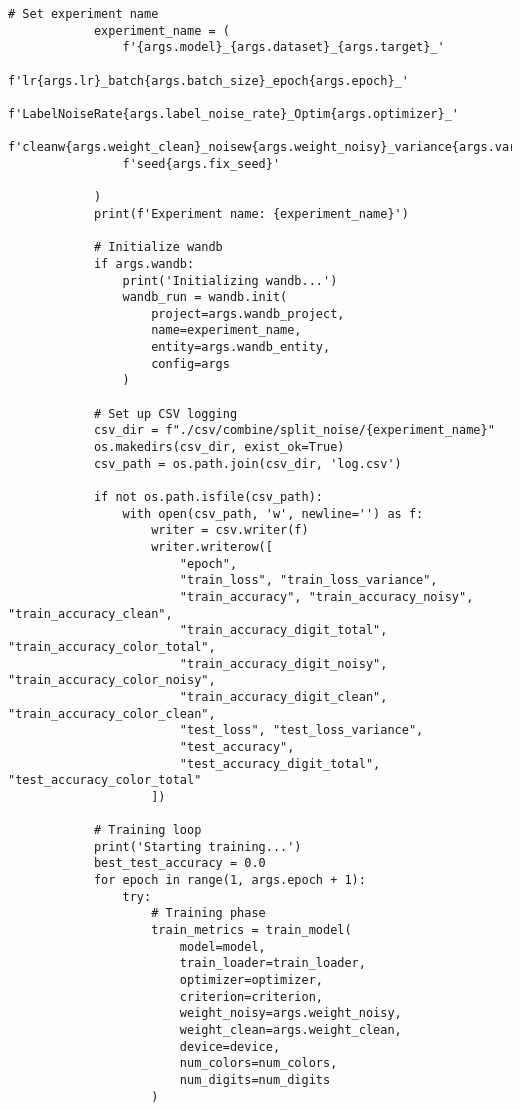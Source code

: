\begin{lstlisting}[style=pythonstyle, caption={Program Example}]
            # Set experiment name
            experiment_name = (
                f'{args.model}_{args.dataset}_{args.target}_'
                f'lr{args.lr}_batch{args.batch_size}_epoch{args.epoch}_'
                f'LabelNoiseRate{args.label_noise_rate}_Optim{args.optimizer}_'
                f'cleanw{args.weight_clean}_noisew{args.weight_noisy}_variance{args.variance}_width{args.model_width}_'
                f'seed{args.fix_seed}'
                
            )
            print(f'Experiment name: {experiment_name}')
    
            # Initialize wandb
            if args.wandb:
                print('Initializing wandb...')
                wandb_run = wandb.init(
                    project=args.wandb_project,
                    name=experiment_name,
                    entity=args.wandb_entity,
                    config=args
                )
    
            # Set up CSV logging
            csv_dir = f"./csv/combine/split_noise/{experiment_name}"
            os.makedirs(csv_dir, exist_ok=True)
            csv_path = os.path.join(csv_dir, 'log.csv')
            
            if not os.path.isfile(csv_path):
                with open(csv_path, 'w', newline='') as f:
                    writer = csv.writer(f)
                    writer.writerow([
                        "epoch", 
                        "train_loss", "train_loss_variance",
                        "train_accuracy", "train_accuracy_noisy", "train_accuracy_clean",
                        "train_accuracy_digit_total", "train_accuracy_color_total",
                        "train_accuracy_digit_noisy", "train_accuracy_color_noisy",
                        "train_accuracy_digit_clean", "train_accuracy_color_clean",
                        "test_loss", "test_loss_variance",
                        "test_accuracy",
                        "test_accuracy_digit_total", "test_accuracy_color_total"
                    ])
    
            # Training loop
            print('Starting training...')
            best_test_accuracy = 0.0
            for epoch in range(1, args.epoch + 1):
                try:
                    # Training phase
                    train_metrics = train_model(
                        model=model,
                        train_loader=train_loader,
                        optimizer=optimizer,
                        criterion=criterion,
                        weight_noisy=args.weight_noisy,
                        weight_clean=args.weight_clean,
                        device=device,
                        num_colors=num_colors,
                        num_digits=num_digits
                    )
    

\end{lstlisting}
